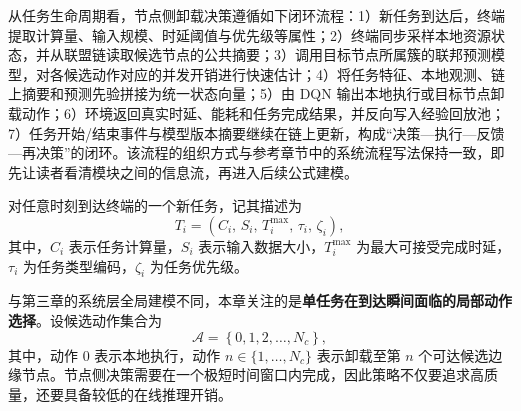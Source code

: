 \begin{table}[H]
\centering
\footnotesize
\caption{任务级卸载框架中的角色划分}
\label{tab:role_division}
\setlength{\tabcolsep}{2.0mm}
\renewcommand{\arraystretch}{1.15}
\end{table}

从任务生命周期看，节点侧卸载决策遵循如下闭环流程：1）新任务到达后，终端提取计算量、输入规模、时延阈值与优先级等属性；2）终端同步采样本地资源状态，并从联盟链读取候选节点的公共摘要；3）调用目标节点所属簇的联邦预测模型，对各候选动作对应的并发开销进行快速估计；4）将任务特征、本地观测、链上摘要和预测先验拼接为统一状态向量；5）由 DQN 输出本地执行或目标节点卸载动作；6）环境返回真实时延、能耗和任务完成结果，并反向写入经验回放池；7）任务开始/结束事件与模型版本摘要继续在链上更新，构成“决策—执行—反馈—再决策”的闭环。该流程的组织方式与参考章节中的系统流程写法保持一致，即先让读者看清模块之间的信息流，再进入后续公式建模。

对任意时刻到达终端的一个新任务，记其描述为
\begin{equation}
T_i = \left(C_i,\, S_i,\, T_i^{\max},\, \tau_i,\, \zeta_i \right),
\label{eq:task_tuple}
\end{equation}
其中，$C_i$ 表示任务计算量，$S_i$ 表示输入数据大小，$T_i^{\max}$ 为最大可接受完成时延，$\tau_i$ 为任务类型编码，$\zeta_i$ 为任务优先级。

与第三章的系统层全局建模不同，本章关注的是\textbf{单任务在到达瞬间面临的局部动作选择}。设候选动作集合为
\begin{equation}
\mathcal{A} = \left\{0,1,2,\ldots,N_c\right\},
\label{eq:action_set}
\end{equation}
其中，动作 $0$ 表示本地执行，动作 $n \in \{1,\ldots,N_c\}$ 表示卸载至第 $n$ 个可达候选边缘节点。节点侧决策需要在一个极短时间窗口内完成，因此策略不仅要追求高质量，还要具备较低的在线推理开销。

